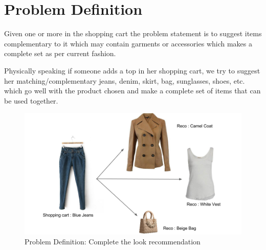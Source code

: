 \chapter{Problem Definition}

Given one or more  in the shopping cart the problem statement is to suggest items complementary to it which may contain garments or accessories which makes a complete set as per current fashion.

Physically speaking if someone adds a top in her shopping cart, we try to suggest her matching/complementary jeans, denim, skirt, bag, sunglasses, shoes, etc. which go well with the product chosen and make a complete set of items that can be used together.


\begin{figure}[htb]
\centering
\includegraphics[scale=0.4]{Untitled} %
\caption{Problem Definition: Complete the look recommendation}
\label{fig:introPic} %
\end{figure}
